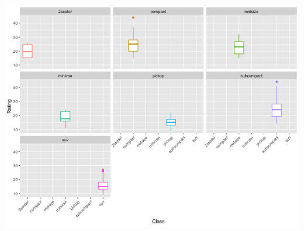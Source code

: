 \documentclass[11pt]{article}
\begin{document}
\begin{org}
\begin{center}
\includegraphics[width=.9\linewidth]{./resources/mpg_facetwrap2.png}
\end{center}
\end{org}
\end{document}
